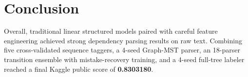 \documentclass[11pt,a4paper]{article}
\begin{document}
\section{Conclusion}

Overall, traditional linear structured models paired with careful feature engineering achieved strong dependency parsing results on raw text. Combining five cross-validated sequence taggers, a 4-seed Graph-MST parser, an 18-parser transition ensemble with mistake-recovery training, and a 4-seed full-tree labeler reached a final Kaggle public score of \textbf{0.8303180}.
\end{document}
